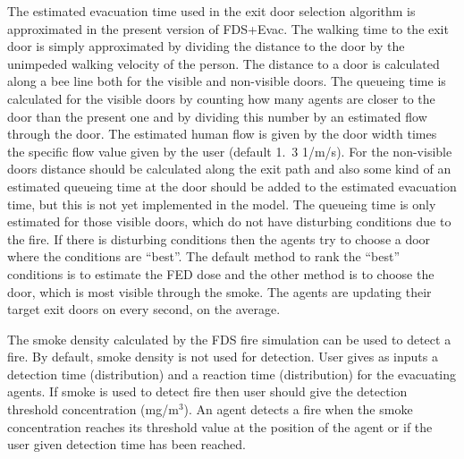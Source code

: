 \documentclass[12pt,a4paper,final,twoside]{stylevk}
\begin{document}
The estimated evacuation time used in the exit door selection
algorithm is approximated in the present version of FDS+Evac.  The
walking time to the exit door is simply approximated by dividing the
distance to the door by the unimpeded walking velocity of the person.
The distance to a door is calculated along a bee line both for the
visible and non-visible doors.  The queueing time is calculated for
the visible doors by counting how many agents are closer to the door
than the present one and by dividing this number by an estimated flow
through the door.  The estimated human flow is given by the door width
times the specific flow value given by the user (default 1.~3 1/m/s).
For the non-visible doors distance should be calculated along the exit
path and also some kind of an estimated queueing time at the door
should be added to the estimated evacuation time, but this is not yet
implemented in the model.  The queueing time is only estimated for
those visible doors, which do not have disturbing conditions due to
the fire.  If there is disturbing conditions then the agents try to
choose a door where the conditions are ``best''.  The default method
to rank the ``best'' conditions is to estimate the FED dose and the
other method is to choose the door, which is most visible through the
smoke.  The agents are updating their target exit doors on every
second, on the average.


The smoke density calculated by the FDS fire simulation can be used to
detect a fire.  By default, smoke density is not used for detection.
User gives as inputs a detection time (distribution) and a reaction
time (distribution) for the evacuating agents.  If smoke is used to
detect fire then user should give the detection threshold
concentration (mg/m${}^3$).  An agent detects a fire when the smoke
concentration reaches its threshold value at the position of the agent
or if the user given detection time has been reached.
\end{document}
